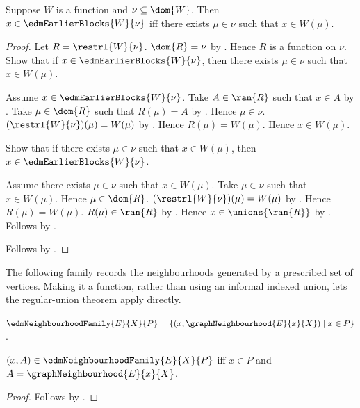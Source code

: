 \begin{proposition}\label{edm_earlier_blocks_iff}
    Suppose $W$ is a function and $\nu\subseteq\dom{W}$.
    Then $x\in\edmEarlierBlocks{W}{\nu}$ iff there exists $\mu\in\nu$
        such that $x\in W(\mu)$.
\end{proposition}
\begin{proof}
    Let $R=\restrl{W}{\nu}$.
    $\dom{R}=\nu$ by
        .
    Hence $R$ is a function on $\nu$.
    Show that if $x\in\edmEarlierBlocks{W}{\nu}$, then there exists
        $\mu\in\nu$ such that $x\in W(\mu)$.
    \begin{subproof}
        Assume $x\in\edmEarlierBlocks{W}{\nu}$.
        Take $A\in\ran{R}$ such that $x\in A$ by
            .
        Take $\mu\in\dom{R}$ such that $R(\mu)=A$ by
            .
        Hence $\mu\in\nu$.
        $(\restrl{W}{\nu})(\mu)=W(\mu)$ by
            .
        Hence $R(\mu)=W(\mu)$.
        Hence $x\in W(\mu)$.
    \end{subproof}
    Show that if there exists $\mu\in\nu$ such that $x\in W(\mu)$,
        then $x\in\edmEarlierBlocks{W}{\nu}$.
    \begin{subproof}
        Assume there exists $\mu\in\nu$ such that $x\in W(\mu)$.
        Take $\mu\in\nu$ such that $x\in W(\mu)$.
        Hence $\mu\in\dom{R}$.
        $(\restrl{W}{\nu})(\mu)=W(\mu)$ by
            .
        Hence $R(\mu)=W(\mu)$.
        $R(\mu)\in\ran{R}$ by .
        Hence $x\in\unions{\ran{R}}$ by .
        Follows by .
    \end{subproof}
    Follows by \auto.
\end{proof}

The following family records the neighbourhoods generated by a prescribed
set of vertices.  Making it a function, rather than using an informal indexed
union, lets the regular-union theorem apply directly.

\begin{definition}\label{edm_neighbourhood_family}
    $\edmNeighbourhoodFamily{E}{X}{P}
        =\{(x,\graphNeighbourhood{E}{x}{X})\mid x\in P\}$.
\end{definition}

\begin{proposition}\label{edm_neighbourhood_family_iff}
    $(x,A)\in\edmNeighbourhoodFamily{E}{X}{P}$ iff
        $x\in P$ and $A=\graphNeighbourhood{E}{x}{X}$.
\end{proposition}
\begin{proof}
    Follows by .
\end{proof}

